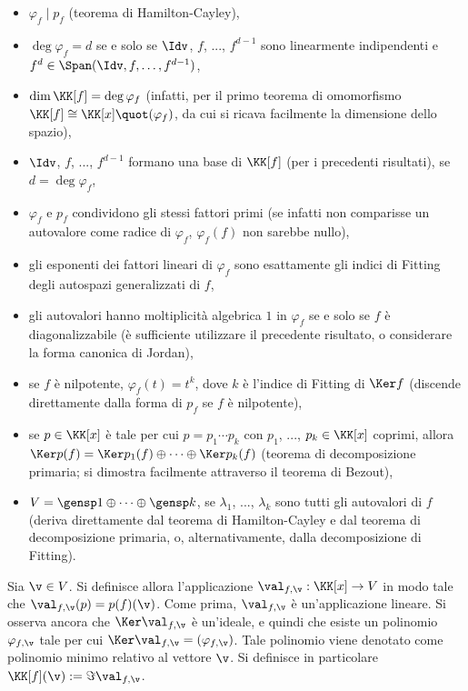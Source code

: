 \documentclass[10pt,landscape]{article}
\begin{document}
\begin{multicols}{3}
		\begin{itemize}
			\item $\varphi_f \mid p_f$ (teorema di Hamilton-Cayley),
			\item $\deg \varphi_f = d$ se e solo se $\Idv$, $f$, ...,
			$f^{d-1}$ sono linearmente indipendenti e $f^d \in \Span(\Idv, f, \ldots, f^{d-1})$,
			\item $\dim \KK[f] = \deg \varphi_f$ (infatti, per
			il primo teorema di omomorfismo $\KK[f] \cong \KK[x]\quot(\varphi_f)$, da cui si ricava
			facilmente la dimensione dello spazio),
			\item $\Idv$, $f$, ..., $f^{d-1}$ formano una base
			di $\KK[f]$ (per i precedenti risultati), se $d = \deg \varphi_f$,
			\item $\varphi_f$ e $p_f$ condividono gli stessi fattori
			primi (se infatti non comparisse un autovalore come radice di $\varphi_f$, $\varphi_f(f)$ non sarebbe nullo),
			\item gli esponenti dei fattori lineari di $\varphi_f$
			sono esattamente gli indici di Fitting degli autospazi
			generalizzati di $f$,
			\item gli autovalori hanno moltiplicità algebrica $1$ in $\varphi_f$ se e solo se $f$ è diagonalizzabile (è sufficiente utilizzare il precedente risultato, o considerare la forma canonica di Jordan),
			\item se $f$ è nilpotente, $\varphi_f(t) = t^k$, dove $k$ è l'indice di Fitting
			di $\Ker f$ (discende direttamente dalla forma di $p_f$ se $f$ è nilpotente),
			\item se $p \in \KK[x]$ è tale per cui $p = p_1 \cdots p_k$ con $p_1$, ..., $p_k \in \KK[x]$ coprimi, allora $\Ker p(f) = \Ker p_1(f) \oplus \cdots \oplus \Ker p_k(f)$ (teorema di decomposizione primaria; si dimostra facilmente attraverso il teorema di Bezout),
			\item $V = \gensp 1 \oplus \cdots \oplus \gensp k$, se $\lambda_1$, ..., $\lambda_k$ sono tutti gli autovalori di $f$ (deriva direttamente dal teorema
			di Hamilton-Cayley e dal teorema di decomposizione primaria, o, alternativamente,
			dalla decomposizione di Fitting).
		\end{itemize}
	
		Sia $\v \in V$. Si definisce allora l'applicazione
		$\val_{f, \v} : \KK[x] \to V$ in modo tale
		che $\val_{f, \v}(p) = p(f)(\v)$. Come prima,
		$\val_{f,\v}$ è un'applicazione lineare. Si osserva
		ancora che $\Ker \val_{f, \v}$ è un'ideale,
		e quindi che esiste un polinomio $\varphi_{f, \v}$
		tale per cui $\Ker \val_{f, \v} = (\varphi_{f, \v})$.
		Tale polinomio viene denotato come polinomio minimo
		relativo al vettore $\v$. Si definisce in particolare
		$\KK[f](\v) := \Im \val_{f, \v}$.
		

\end{multicols}
\end{document}
